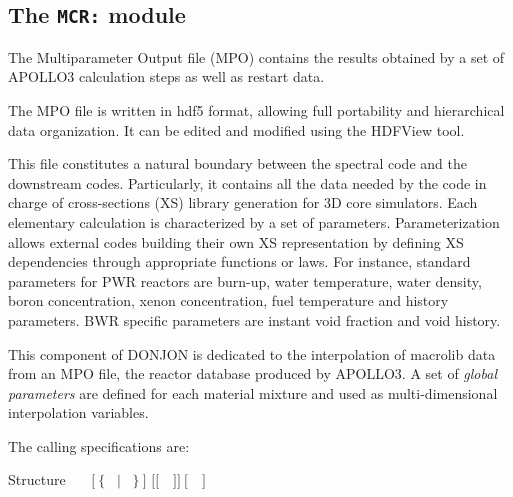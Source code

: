 \subsection{The {\tt MCR:} module}\label{sect:MCRData}

The Multiparameter Output file (MPO) contains the results obtained by a set of APOLLO3 calculation steps as well as restart data.

The MPO file is written in {\sc hdf5} format, allowing full portability and hierarchical data organization. It can be edited and modified using
the HDFView tool.

This file constitutes a natural boundary between the spectral code and the downstream codes. Particularly, it contains all the data needed by the
code in charge of cross-sections (XS) library generation for 3D core simulators.
Each elementary calculation is characterized by a set of parameters. Parameterization allows external codes building their own XS representation
by defining XS dependencies through appropriate functions or laws. For instance, standard parameters for PWR reactors are burn-up, water temperature,
water density, boron concentration, xenon concentration, fuel temperature and history parameters. BWR specific parameters are instant void fraction and
void history.

This component of DONJON is dedicated to the interpolation of {\sc macrolib} data from an MPO file, the reactor database produced by APOLLO3.\cite{apollo3}
A set of {\sl global parameters} are defined for each material mixture and used as multi-dimensional interpolation variables.

\vskip 0.02cm

The calling specifications are:

\begin{DataStructure}{Structure }
~\moc{:=}~~$[~\{$~ $|$ ~$\}~]$  $[[$~~$]]~[$~~$]$~\moc{::}~ \\
\end{DataStructure}

